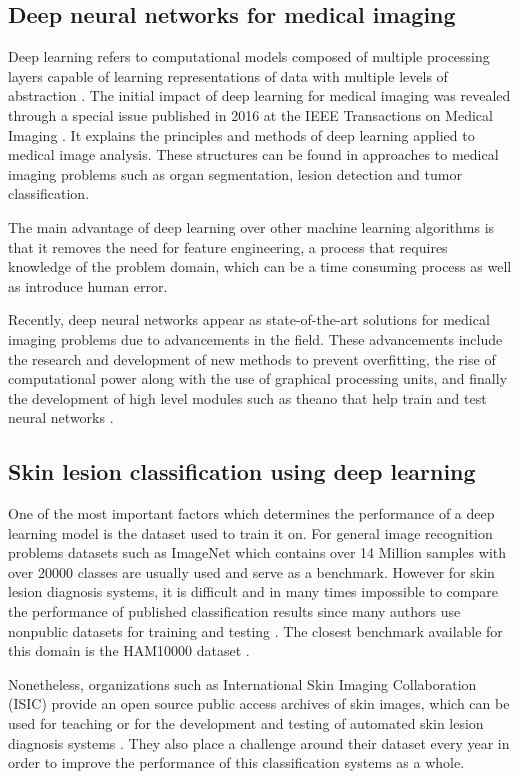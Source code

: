 \subsection{Deep neural networks for medical imaging}
Deep learning refers to computational models composed of multiple processing layers capable of learning representations of data with multiple levels of abstraction \cite{Goodfellow-et-al-2016}. The initial impact of deep learning for medical imaging was revealed through a special issue published in 2016 at the IEEE Transactions on Medical Imaging \cite{Greenspan2016}. It explains the principles and methods of deep learning applied to medical image analysis. These structures can be found in approaches to medical imaging problems such as organ segmentation, lesion detection and tumor classification. \par
The main advantage of deep learning over other machine learning algorithms is that it removes the need for feature engineering, a process that requires knowledge of the problem domain, which can be a time consuming process as well as introduce human error.\par
Recently, deep neural networks appear as state-of-the-art solutions for medical imaging problems due to advancements in the field. These advancements include the research and development of new methods to prevent overfitting, the rise of computational power along with the use of graphical processing units, and finally the development of high level modules such as theano \cite{Bastien} that help train and test neural networks . 
\subsection{Skin lesion classification using deep learning}
One of the most important factors which determines the performance of a deep learning model is the dataset used to train it on. For general image recognition problems datasets such as ImageNet \cite{Deng2010} which contains over 14 Million samples with over 20000 classes are usually used and serve as a benchmark. However for skin lesion diagnosis systems, it is difficult and in many times impossible to compare the performance of published classification results since many authors use nonpublic datasets for training and testing \cite{Brinker2018}. The closest benchmark available for this domain is the HAM10000 dataset \cite{ham10000}. \par
Nonetheless, organizations such as International Skin Imaging Collaboration (ISIC) provide an open source public access archives of skin images, which can be used for teaching or for the development and testing of automated skin lesion diagnosis systems \cite{isic2019}. They also place a challenge around their dataset every year in order to improve the performance of this classification systems as a whole. \par

